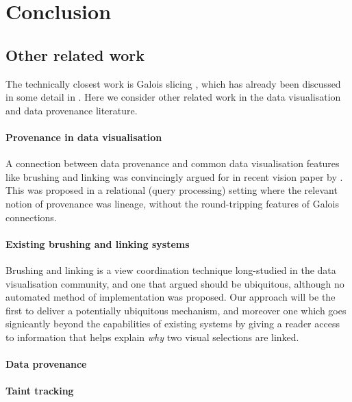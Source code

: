 \section{Conclusion}
\label{sec:conclusion}

\subsection{Other related work}
\label{sec:conclusion:other-related-work}

The technically closest work is Galois slicing \cite{perera12a,ricciotti17,perera16d}, which has already been discussed in some detail in . Here we consider other related work in the data visualisation and data provenance literature.

\paragraph{Provenance in data visualisation}

A connection between data provenance and common data visualisation features like brushing and linking was convincingly argued for in recent vision paper by \citet{psallidas18}. This was proposed in a relational (query processing) setting where the relevant notion of provenance was lineage, without the round-tripping features of Galois connections.

\paragraph{Existing brushing and linking systems}

Brushing and linking is a view coordination technique long-studied in the data visualisation community, and one that \citet{roberts06} argued should be ubiquitous, although no automated method of implementation was proposed. Our approach will be the first to deliver a potentially ubiquitous mechanism, and moreover one which goes signicantly beyond the capabilities of existing systems by giving a reader access to information that helps explain \emph{why} two visual selections are linked.

\paragraph{Data provenance}

\paragraph{Taint tracking}

